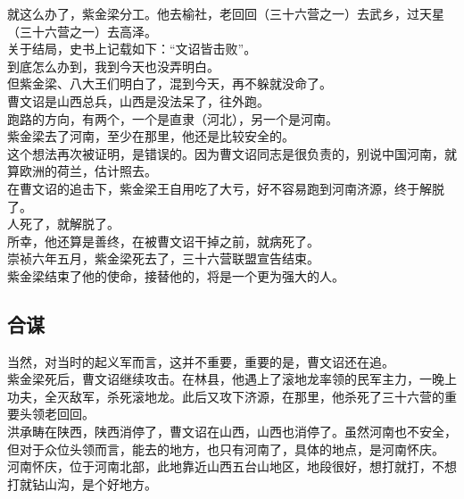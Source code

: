 \begin{multicols}{\theparacolNo}
就这么办了，紫金梁分工。他去榆社，老回回（三十六营之一）去武乡，过天星（三十六营之一）去高泽。\\

关于结局，史书上记载如下：“文诏皆击败”。\\

到底怎么办到，我到今天也没弄明白。\\

但紫金梁、八大王们明白了，混到今天，再不躲就没命了。\\

曹文诏是山西总兵，山西是没法呆了，往外跑。\\

跑路的方向，有两个，一个是直隶（河北），另一个是河南。\\

紫金梁去了河南，至少在那里，他还是比较安全的。\\

这个想法再次被证明，是错误的。因为曹文诏同志是很负责的，别说中国河南，就算欧洲的荷兰，估计照去。\\

在曹文诏的追击下，紫金梁王自用吃了大亏，好不容易跑到河南济源，终于解脱了。\\

人死了，就解脱了。\\

所幸，他还算是善终，在被曹文诏干掉之前，就病死了。\\

崇祯六年五月，紫金梁死去了，三十六营联盟宣告结束。\\

紫金梁结束了他的使命，接替他的，将是一个更为强大的人。\\

\subsection{合谋}
当然，对当时的起义军而言，这并不重要，重要的是，曹文诏还在追。\\

紫金梁死后，曹文诏继续攻击。在林县，他遇上了滚地龙率领的民军主力，一晚上功夫，全灭敌军，杀死滚地龙。此后又攻下济源，在那里，他杀死了三十六营的重要头领老回回。\\

洪承畴在陕西，陕西消停了，曹文诏在山西，山西也消停了。虽然河南也不安全，但对于众位头领而言，能去的地方，也只有河南了，具体的地点，是河南怀庆。\\

河南怀庆，位于河南北部，此地靠近山西五台山地区，地段很好，想打就打，不想打就钻山沟，是个好地方。\\


\end{multicols}
